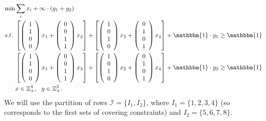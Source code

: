 \documentclass[smallextended]{svjour3}
\begin{document}
		\begin{align}
		\min & \sum_{i} x_i + \infty \cdot (y_1 + y_2)\\
		s.t.~& \left[\left(\begin{array}{c} 1\\1\\0\\0 \end{array}  \right) x_1 + \left(\begin{array}{c} 0\\0\\1\\1 \end{array}  \right) x_2  \right] + \left[\left(\begin{array}{c} 1\\0\\1\\0 \end{array}  \right) x_3 + \left(\begin{array}{c} 0\\1\\0\\1 \end{array}  \right) x_4  \right] + {\mathbbm{1}} \cdot y_1 \ge {\mathbbm{1}} \label{eq:covLB1}\\
		& \left[\left(\begin{array}{c} 1\\1\\0\\0 \end{array}  \right) x_1 + \left(\begin{array}{c} 0\\0\\1\\1 \end{array}  \right) x_3  \right] + \left[\left(\begin{array}{c} 1\\0\\1\\0 \end{array}  \right) x_2 + \left(\begin{array}{c} 0\\1\\0\\1 \end{array}  \right) x_4  \right] + {\mathbbm{1}} \cdot y_2 \ge {\mathbbm{1}} \label{eq:covLB2}\\
		&x \in {\mathbb{Z}}_+^4, ~~y \in {\mathbb{Z}}^2_+. 
	\end{align}
	We will use the partition of rows ${\mathcal{I}} = \{I_1, I_2\}$, where $I_1 = \{1, 2, 3, 4\}$ (so corresponds to the first sets of covering constraints) and $I_2 = \{5, 6, 7, 8\}$.
	
\end{document}
